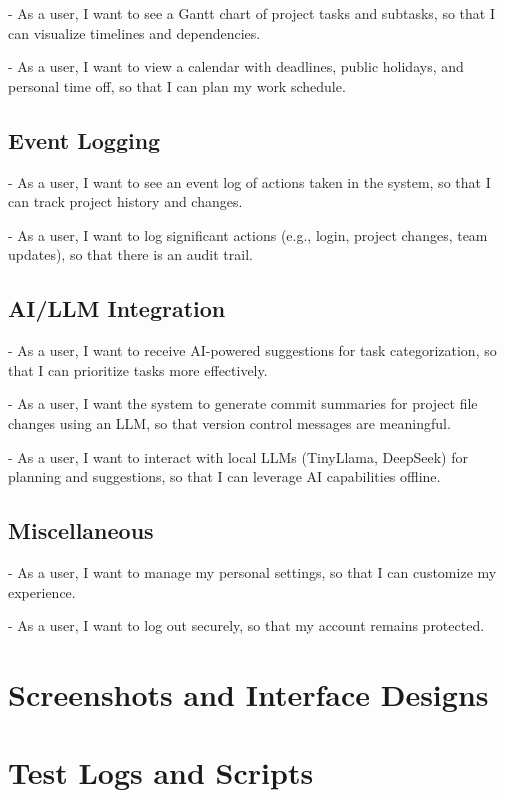 \documentclass{report}
\begin{document}
- As a user, I want to see a Gantt chart of project tasks and subtasks, so that I can visualize timelines and dependencies.

- As a user, I want to view a calendar with deadlines, public holidays, and personal time off, so that I can plan my work schedule.

\section{Event Logging}
- As a user, I want to see an event log of actions taken in the system, so that I can track project history and changes.

- As a user, I want to log significant actions (e.g., login, project changes, team updates), so that there is an audit trail.

\section{AI/LLM Integration}
- As a user, I want to receive AI-powered suggestions for task categorization, so that I can prioritize tasks more effectively.

- As a user, I want the system to generate commit summaries for project file changes using an LLM, so that version control messages are meaningful.

- As a user, I want to interact with local LLMs (TinyLlama, DeepSeek) for planning and suggestions, so that I can leverage AI capabilities offline.

\section{Miscellaneous}
- As a user, I want to manage my personal settings, so that I can customize my experience.

- As a user, I want to log out securely, so that my account remains protected.

\chapter{Screenshots and Interface Designs}
\chapter{Test Logs and Scripts}
\end{document}
